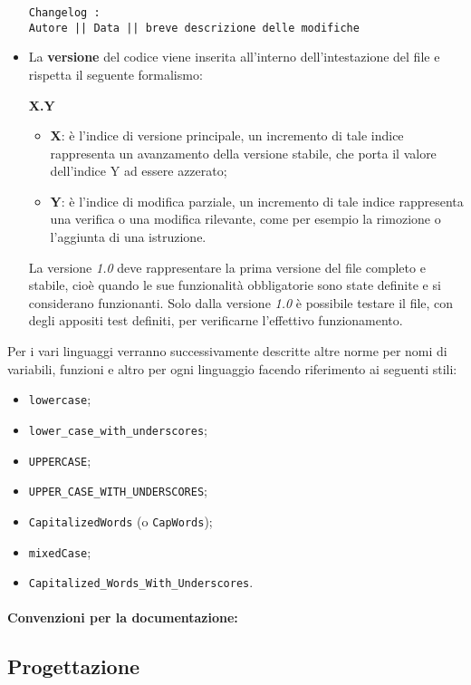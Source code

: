 \documentclass[NormeDiProgetto.tex]{subfiles}
\begin{document}
\begin{itemize}
\begin{center}
{\begin{minipage}{12cm}
\begin{Verbatim}[frame=single]
Changelog :
Autore || Data || breve descrizione delle modifiche
		\end{Verbatim}
	\end{minipage}
}
\end{center}
\item La \textbf{versione} del codice viene inserita all’interno dell’intestazione del file e rispetta il
seguente formalismo:
\begin{center}{\textbf{X.Y}}\end{center}	
\begin{itemize}
\item \textbf{X}: è l’indice di versione principale, un incremento di tale indice rappresenta un avanzamento della versione stabile, che porta il valore dell’indice Y ad essere azzerato;
\item \textbf{Y}: è l’indice di modifica parziale, un incremento di tale indice rappresenta una verifica o una modifica rilevante, come per esempio la rimozione o l’aggiunta di una istruzione.
\end{itemize}
La versione \textit{1.0} deve rappresentare la prima versione del file completo e stabile, cioè quando le sue funzionalità obbligatorie sono state definite e si considerano funzionanti. Solo dalla versione \textit{1.0} è possibile testare il file, con degli appositi test definiti, per	verificarne l’effettivo funzionamento.
\end{itemize}
Per i vari linguaggi verranno successivamente descritte altre norme per nomi di variabili, funzioni e altro per ogni linguaggio facendo riferimento ai seguenti stili:
\begin{itemize}
	\item \texttt{lowercase};
	\item \texttt{lower\_case\_with\_underscores};
	\item \texttt{UPPERCASE};
	\item \texttt{UPPER\_CASE\_WITH\_UNDERSCORES};
	\item \texttt{CapitalizedWords} (o \texttt{CapWords});
	\item \texttt{mixedCase};
	\item \texttt{Capitalized\_Words\_With\_Underscores}.
\end{itemize}

\paragraph*{Convenzioni per la documentazione: }







\subsection{Progettazione}
\end{document}
